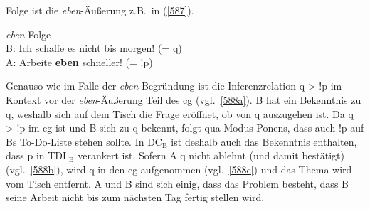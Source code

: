 Folge ist die \textit{eben}-Äußerung z.B.\ in (\ref{587}).

\begin{exe}
	\ex\label{587} \textit{eben}-Folge\\
	B: Ich schaffe es nicht bis morgen! (= q)\\
	A: Arbeite \textbf{eben} schneller! (= !p)
\end{exe}	
Genauso wie im Falle der \textit{eben}-Begründung ist die Inferenzrelation q > !p im Kontext vor der \textit{eben}-Äußerung Teil des cg (vgl.\ \ref{588a}). B hat ein Bekenntnis zu q, weshalb sich auf dem Tisch die Frage eröffnet, ob von q auszugehen ist. Da q > !p im cg ist und B sich zu q bekennt, folgt qua  Modus Ponens, dass auch !p auf Bs To-Do-Liste stehen sollte. In DC$_{\textrm{B}}$ ist deshalb auch das Bekenntnis enthalten, dass p in TDL$_{\textrm{B}}$ verankert ist. Sofern A q nicht ablehnt (und damit bestätigt) (vgl.\ \ref{588b}), wird q in den cg aufgenommen (vgl.\ \ref{588c}) und das Thema wird vom Tisch entfernt. A und B sind sich einig, dass das Problem besteht, dass B seine Arbeit nicht bis zum nächsten Tag fertig stellen wird.\largerpage[2]



